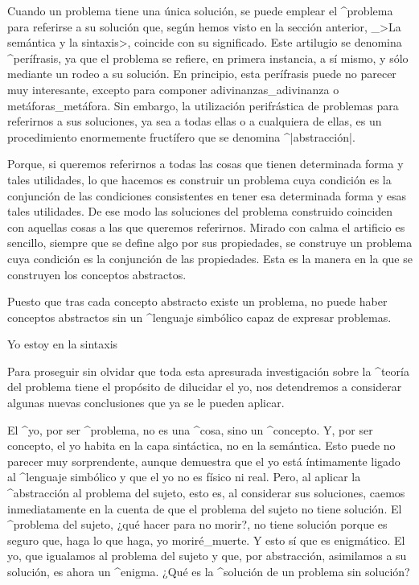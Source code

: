 Cuando un problema tiene una única solución, se puede emplear el
^{problema} para referirse a su solución que, según hemos visto en la
sección anterior, _>La semántica y la sintaxis>, coincide con su
significado. Este artilugio se denomina ^{perífrasis}, ya que el
problema se refiere, en primera instancia, a sí mismo, y sólo mediante
un rodeo a su solución. En principio, esta perífrasis puede no parecer
muy interesante, excepto para componer adivinanzas_{adivinanza} o
metáforas_{metáfora}. Sin embargo, la utilización perifrástica de
problemas para referirnos a sus soluciones, ya sea a todas ellas o a
cualquiera de ellas, es un procedimiento enormemente fructífero que se
denomina ^|abstracción|.

Porque, si queremos referirnos a todas las cosas que tienen determinada
forma y tales utilidades, lo que hacemos es construir un problema cuya
condición es la conjunción de las condiciones consistentes en tener esa
determinada forma y esas tales utilidades. De ese modo las soluciones
del problema construido coinciden con aquellas cosas a las que queremos
referirnos. Mirado con calma el artificio es sencillo, siempre que se
define algo por sus propiedades, se construye un problema cuya condición
es la conjunción de las propiedades. Esta es la manera en la que se
construyen los conceptos abstractos.

Puesto que tras cada concepto abstracto existe un problema, no puede
haber conceptos abstractos sin un ^{lenguaje simbólico} capaz de
expresar problemas.


\Section Yo estoy en la sintaxis

Para proseguir sin olvidar que toda esta apresurada investigación sobre
la ^{teoría del problema} tiene el propósito de dilucidar el yo, nos
detendremos a considerar algunas nuevas conclusiones que ya se le pueden
aplicar.

El ^{yo}, por ser ^{problema}, no es una ^{cosa}, sino un ^{concepto}.
Y, por ser concepto, el yo habita en la capa sintáctica, no en la
semántica. Esto puede no parecer muy sorprendente, aunque demuestra que
el yo está íntimamente ligado al ^{lenguaje simbólico} y que el yo no es
físico ni real. Pero, al aplicar la ^{abstracción} al problema del
sujeto, esto es, al considerar sus soluciones, caemos inmediatamente en
la cuenta de que el problema del sujeto no tiene solución. El ^{problema
del sujeto}, ¿qué hacer para no morir?, no tiene solución porque es
seguro que, haga lo que haga, yo moriré_{muerte}. Y esto sí que es
enigmático. El yo, que igualamos al problema del sujeto y que, por
abstracción, asimilamos a su solución, es ahora un ^{enigma}. ¿Qué es la
^{solución} de un problema sin solución?


